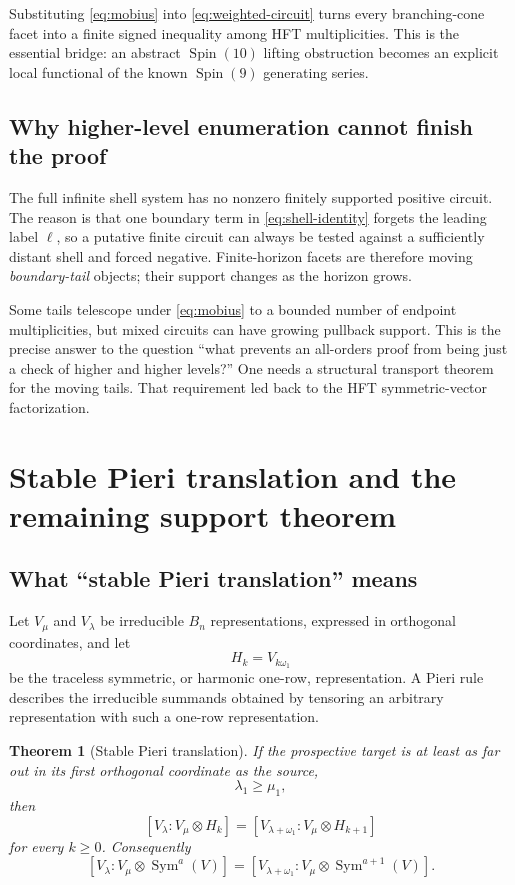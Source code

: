 \documentclass[11pt,a4paper]{article}
\newtheorem{theorem}{Theorem}[section]
\theoremstyle{definition}
\newcommand{\Spin}{\operatorname{Spin}}
\begin{document}
Substituting \eqref{eq:mobius} into
\eqref{eq:weighted-circuit} turns every branching-cone facet into a finite
signed inequality among HFT multiplicities.  This is the essential bridge:
an abstract $\Spin(10)$ lifting obstruction becomes an explicit local
functional of the known $\Spin(9)$ generating series.

\subsection{Why higher-level enumeration cannot finish the proof}

The full infinite shell system has no nonzero finitely supported positive
circuit.  The reason is that one boundary term in
\eqref{eq:shell-identity} forgets the leading label $\ell$, so a putative
finite circuit can always be tested against a sufficiently distant shell and
forced negative.  Finite-horizon facets are therefore moving
\emph{boundary-tail} objects; their support changes as the horizon grows.

Some tails telescope under \eqref{eq:mobius} to a bounded number of endpoint
multiplicities, but mixed circuits can have growing pullback support.  This is
the precise answer to the question ``what prevents an all-orders proof from
being just a check of higher and higher levels?''  One needs a structural
transport theorem for the moving tails.  That requirement led back to the
HFT symmetric-vector factorization.

\section{Stable Pieri translation and the remaining support theorem}

\subsection{What ``stable Pieri translation'' means}

Let $V_\mu$ and $V_\lambda$ be irreducible $B_n$ representations, expressed
in orthogonal coordinates, and let
\[
   H_k=V_{k\omega_1}
\]
be the traceless symmetric, or harmonic one-row, representation.  A Pieri
rule describes the irreducible summands obtained by tensoring an arbitrary
representation with such a one-row representation.

\begin{theorem}[Stable Pieri translation]
If the prospective target is at least as far out in its first orthogonal
coordinate as the source,
\[
   \lambda_1\geq\mu_1,
\]
then
\begin{equation}
\label{eq:stable-pieri-harmonic}
 [V_\lambda:V_\mu\otimes H_k]
 =
 [V_{\lambda+\omega_1}:V_\mu\otimes H_{k+1}]
\end{equation}
for every $k\geq0$.  Consequently
\begin{equation}
\label{eq:stable-pieri-symmetric}
 [V_\lambda:V_\mu\otimes\operatorname{Sym}^{a}(V)]
 =
 [V_{\lambda+\omega_1}:
  V_\mu\otimes\operatorname{Sym}^{a+1}(V)].
\end{equation}
\end{theorem}
\end{document}
